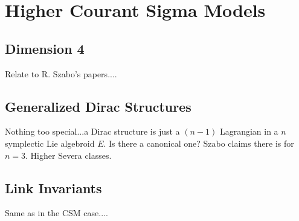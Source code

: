 \section{Higher Courant Sigma Models}

\subsection{Dimension 4}

Relate to R. Szabo's papers....

\subsection{Generalized Dirac Structures}

Nothing too special...a Dirac structure is just a $(n-1)$ Lagrangian in a $n$ symplectic Lie algebroid $E$.  Is there a canonical one? Szabo claims there is for $n=3$. Higher Severa classes.


\subsection{Link Invariants}

Same as in the CSM case....